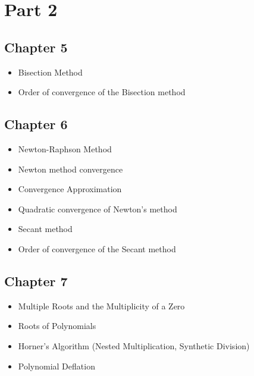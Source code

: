\documentclass [titlepage,12pt,letter] {article}
\begin{document}
\section{Part 2}

\subsection{Chapter 5}

\begin{itemize}

\item{Bisection Method}

\item{Order of convergence of the Bisection method} 

\end{itemize}

\subsection{Chapter 6}

\begin{itemize}

\item{Newton-Raphson Method}

\item{Newton method convergence}  

\item{Convergence Approximation}

\item{Quadratic convergence of Newton's method} 

\item{Secant method} 

\item{Order of convergence of the Secant method} 

\end{itemize}

\subsection{Chapter 7}

\begin{itemize}

\item{Multiple Roots and the Multiplicity of a Zero} 

\item{Roots of Polynomials} 

\item{Horner's Algorithm (Nested Multiplication, Synthetic Division)} 

\item{Polynomial Deflation} 

\end{itemize}
\end{document}
